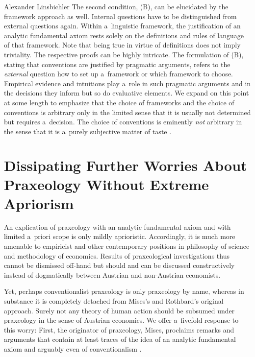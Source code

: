 \begin{artengenv}{Alexander Linsbichler}
The second condition, (B), can be elucidated by the framework approach as well. Internal questions have to be distinguished from external questions again. Within a~linguistic framework, the justification of an analytic fundamental axiom rests solely on the definitions and rules of language of that framework. Note that being true in virtue of definitions does not imply triviality. The respective proofs can be highly intricate. The formulation of (B), stating that conventions are justified by pragmatic arguments, refers to the \textit{external} question how to set up a~framework or which framework to choose. Empirical evidence and intuitions play a~role in such pragmatic arguments and in the decisions they inform but so do evaluative elements. We expand on this point at some length to emphasize that the choice of frameworks and the choice of conventions is arbitrary only in the limited sense that it is usually not determined but requires a~decision. The choice of conventions is eminently \textit{not} arbitrary in the sense that it is a~purely subjective matter of taste 
\parencites[see also][p.3379]{linsbichler_austrian_2021}[][]{dambock_factvalue_2024}.%




\section{Dissipating Further Worries About Praxeology Without Extreme Apriorism}

An explication of praxeology with an analytic fundamental axiom and with limited a~priori scope is only mildly aprioristic. Accordingly, it is much more amenable to empiricist and other contemporary positions in philosophy of science and methodology of economics. Results of praxeological investigations thus cannot be dismissed off-hand but should and can be discussed constructively instead of dogmatically between Austrian and non-Austrian economists.



Yet, perhaps conventionalist praxeology is only praxeology by name, whereas in substance it is completely detached from Mises's and Rothbard's original approach. Surely not any theory of human action should be subsumed under praxeology in the sense of Austrian economics. We offer a~fivefold response to this worry: First, the originator of praxeology, Mises, proclaims remarks and arguments that contain at least traces of the idea of an analytic fundamental axiom and arguably even of conventionalism 
\parencite[][pp.3376–3378]{linsbichler_austrian_2021}.%





\end{artengenv}
